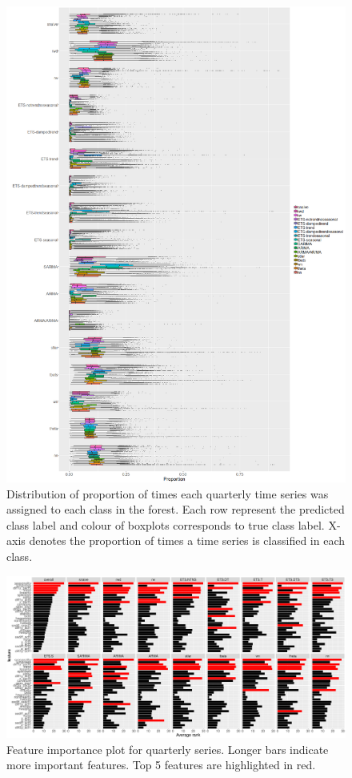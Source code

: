 \documentclass[11pt,a4paper,]{article}
\theoremstyle{definition}
\theoremstyle{definition}
\theoremstyle{definition}
\theoremstyle{remark}
\begin{document}
\begin{figure}
\centering
\includegraphics{figures/oobquarterly-1.png}
\caption{\label{fig:oobquarterly}Distribution of proportion of times each
quarterly time series was assigned to each class in the forest. Each row
represent the predicted class label and colour of boxplots corresponds
to true class label. X-axis denotes the proportion of times a time
series is classified in each class.}
\end{figure}

\newpage

\begin{figure}[h]

{\centering \includegraphics{figures/viquarterly-1} 

}

\caption{Feature importance plot for quarterly series. Longer bars indicate more important features. Top 5 features are highlighted in red.}\label{fig:viquarterly}
\end{figure}
\end{document}
